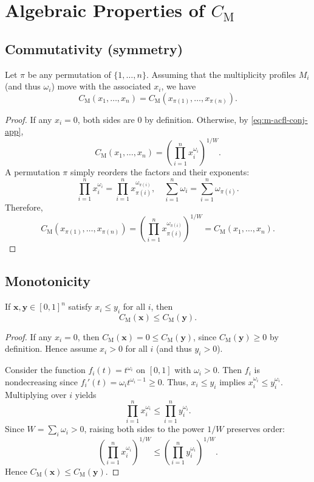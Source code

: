 \documentclass[11pt]{article}
\begin{document}
\section{Algebraic Properties of $C_{\mathrm{M}}$}

\subsection{Commutativity (symmetry)}

\begin{proposition}[Commutativity]
Let $\pi$ be any permutation of $\{1,\dots,n\}$. 
Assuming that the multiplicity profiles $M_i$ (and thus $\omega_i$) move with the associated $x_i$, we have
\[
C_{\mathrm{M}}(x_1,\dots,x_n) = C_{\mathrm{M}}(x_{\pi(1)},\dots,x_{\pi(n)}).
\]
\end{proposition}

\begin{proof}
If any $x_i=0$, both sides are $0$ by definition.
Otherwise, by \eqref{eq:m-acfl-conj-app},
\[
C_{\mathrm{M}}(x_1,\dots,x_n)
= \left(\prod_{i=1}^n x_i^{\omega_i}\right)^{1/W}.
\]
A permutation $\pi$ simply reorders the factors and their exponents:
\[
\prod_{i=1}^n x_i^{\omega_i}
= \prod_{i=1}^n x_{\pi(i)}^{\omega_{\pi(i)}},
\quad
\sum_{i=1}^n \omega_i
= \sum_{i=1}^n \omega_{\pi(i)}.
\]
Therefore,
\[
C_{\mathrm{M}}(x_{\pi(1)},\dots,x_{\pi(n)})
= \left(\prod_{i=1}^n x_{\pi(i)}^{\omega_{\pi(i)}}\right)^{1/W}
= C_{\mathrm{M}}(x_1,\dots,x_n).
\]
\end{proof}

\subsection{Monotonicity}

\begin{proposition}[Monotonicity]
If $\mathbf{x}, \mathbf{y} \in [0,1]^n$ satisfy $x_i \le y_i$ for all $i$, then
\[
C_{\mathrm{M}}(\mathbf{x}) \le C_{\mathrm{M}}(\mathbf{y}).
\]
\end{proposition}

\begin{proof}
If any $x_i = 0$, then $C_{\mathrm{M}}(\mathbf{x}) = 0 \le C_{\mathrm{M}}(\mathbf{y})$, since $C_{\mathrm{M}}(\mathbf{y}) \ge 0$ by definition. 
Hence assume $x_i>0$ for all $i$ (and thus $y_i>0$).

Consider the function $f_i(t) = t^{\omega_i}$ on $[0,1]$ with $\omega_i>0$. 
Then $f_i$ is nondecreasing since $f_i'(t) = \omega_i t^{\omega_i - 1} \ge 0$. 
Thus, $x_i \le y_i$ implies $x_i^{\omega_i} \le y_i^{\omega_i}$. 
Multiplying over $i$ yields
\[
\prod_{i=1}^n x_i^{\omega_i} \le \prod_{i=1}^n y_i^{\omega_i}.
\]
Since $W=\sum_i \omega_i>0$, raising both sides to the power $1/W$ preserves order:
\[
\left(\prod_{i=1}^n x_i^{\omega_i}\right)^{1/W}
\le
\left(\prod_{i=1}^n y_i^{\omega_i}\right)^{1/W}.
\]
Hence $C_{\mathrm{M}}(\mathbf{x}) \le C_{\mathrm{M}}(\mathbf{y})$.
\end{proof}
\end{document}
